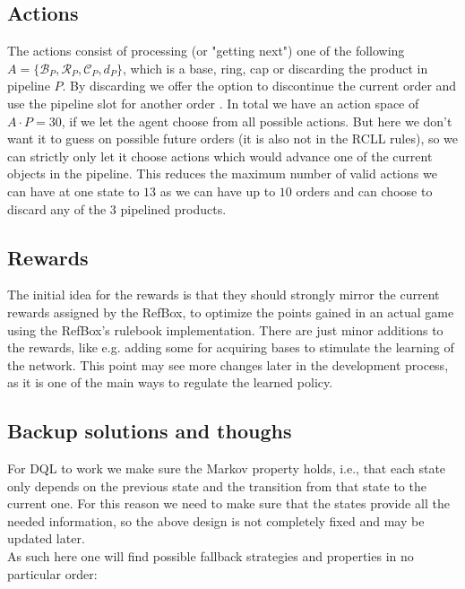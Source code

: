\documentclass[runningheads,envcountsect]{llncs}
\begin{document}
\subsection{Actions}
The actions consist of processing (or "getting next") one of the following $A=\{\mathcal{B}_P, \mathcal{R}_P, \mathcal{C}_P, d_P\}$, which is a base, ring, cap or discarding the product in pipeline $P$. By discarding we offer the option to discontinue the current order and use the pipeline slot for another order  . In total we have an action space of $A\cdot P = 30$, if we let the agent choose from all possible actions. But here we don't want it to guess on possible future orders (it is also not in the RCLL rules), so we can strictly only let it choose actions which would advance one of the current objects in the pipeline. This reduces the maximum number of valid actions we can have at one state to $13$ as we can have up to $10$ orders and can choose to discard any of the 3 pipelined products.


\subsection{Rewards}
The initial idea for the rewards is that they should strongly mirror the current rewards assigned by the RefBox, to optimize the points gained in an actual game using the RefBox's rulebook implementation. There are just minor additions to the rewards, like e.g. adding some for acquiring bases to stimulate the learning of the network. This point may see more changes later in the development process, as it is one of the main ways to regulate the learned policy.


\subsection{Backup solutions and thoughs} \label{risks}
For DQL to work we make sure the Markov property holds, i.e., that each state only depends on the previous state and the transition from that state to the current one. For this reason we need to make sure that the states provide all the needed information, so the above design is not completely fixed and may be updated later.\\
As such here one will find possible fallback strategies and properties in no particular order:
\end{document}
